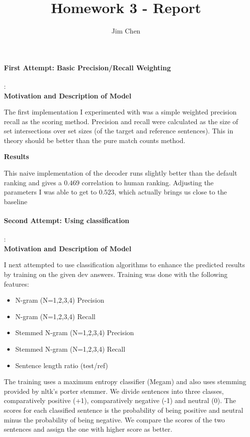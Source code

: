\documentclass{article}
\title{Homework 3 - Report}
\author{Jim Chen}
\begin{document}
\thispagestyle{plain}\maketitle
\paragraph{First Attempt: Basic Precision/Recall Weighting}

:\\

{\bf Motivation and Description of Model} 

The first implementation I experimented with was a simple weighted precision recall as the scoring method. Precision and recall were calculated as the size of set intersections over set sizes (of the target and reference sentences). This in theory should be better than the pure match counts method.  

{\bf Results} 

This naive implementation of the decoder runs slightly better than the default ranking and gives a $0.469$ correlation to human ranking. Adjusting the parameters I was able to get to $0.523$, which actually brings us close to the baseline

\paragraph{Second Attempt: Using classification}

:\\

{\bf Motivation and Description of Model} 

I next attempted to use classification algorithms to enhance the predicted results by training on the given dev answers. Training was done with the following features:

\begin{itemize}
\item N-gram (N=1,2,3,4) Precision
\item N-gram (N=1,2,3,4) Recall
\item Stemmed N-gram (N=1,2,3,4) Precision
\item Stemmed N-gram (N=1,2,3,4) Recall
\item Sentence length ratio (test/ref)
\end{itemize}

The training uses a maximum entropy classifier (Megam) and also uses stemming provided by nltk's porter stemmer. We divide sentences into three classes, comparatively positive (+1), comparatively negative (-1) and neutral (0). The scores for each classified sentence is the probability of being positive and neutral minus the probability of being negative. We compare the scores of the two sentences and assign the one with higher score as better.\\
\end{document}
